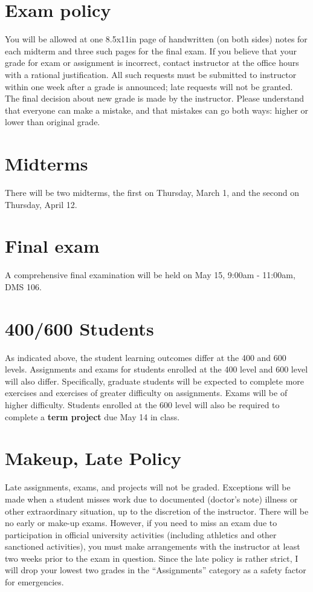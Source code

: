 \documentclass[11pt,onecolumn]{article}
\begin{document}
\section*{Exam policy} You will be allowed at one 8.5x11in page of handwritten (on both sides) notes for each midterm and three such pages for the final exam. If you believe that your grade for exam or assignment is incorrect, contact instructor at the office hours with a rational justification. All such requests must be submitted to instructor within one week after a grade is announced; late requests will not be granted. The final decision about new grade is made by the instructor. Please understand that everyone can make a mistake, and that mistakes can go both ways: higher or lower than original grade.

\section*{Midterms}
There will be two midterms, the first on Thursday, March 1, and the second on Thursday, April 12.

\section*{Final exam}
A comprehensive final examination will be held on May 15, 9:00am - 11:00am, DMS 106.

\section*{400/600 Students}
As indicated above, the student learning outcomes differ at the 400 and 600 levels. Assignments and exams for students enrolled at the 400 level and 600 level will also differ. Specifically, graduate students will be expected to complete more exercises and exercises of greater difficulty on assignments. Exams will be of higher difficulty. Students enrolled at the 600 level will also be required to complete a \textbf{term project} due May 14 in class.

\section*{Makeup, Late Policy}
Late assignments, exams, and projects will not be graded. Exceptions will be made when a student misses work due to documented (doctor's note) illness or other extraordinary situation, up to the discretion of the instructor. There will be no early or make-up exams. However, if you need to miss an exam due to participation in official university activities (including athletics and other sanctioned activities), you must make arrangements with the instructor at least two weeks prior to the exam in question. Since the late policy is rather strict, I will drop your lowest two grades in the ``Assignments'' category as a safety factor for emergencies.
\end{document}
